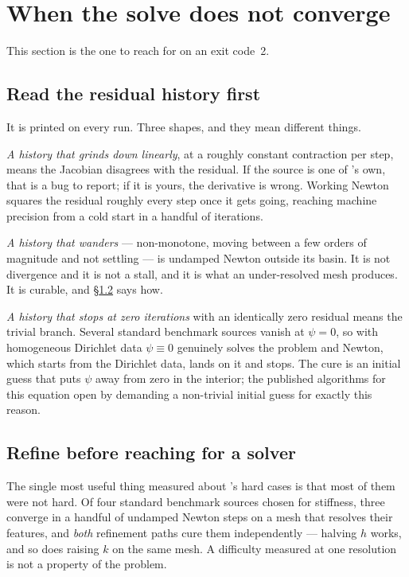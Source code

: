 \section{When the solve does not converge}
\label{sec:notconverge}

This section is the one to reach for on an exit code~2.

\subsection{Read the residual history first}

It is printed on every run. Three shapes, and they mean different things.

\emph{A history that grinds down linearly}, at a roughly constant contraction
per step, means the Jacobian disagrees with the residual. If the source is one
of {\meq}'s own, that is a bug to report; if it is yours, the derivative is
wrong. Working Newton squares the residual roughly every step once it gets
going, reaching machine precision from a cold start in a handful of iterations.

\emph{A history that wanders} --- non-monotone, moving between a few orders of
magnitude and not settling --- is undamped Newton outside its basin. It is not
divergence and it is not a stall, and it is what an under-resolved mesh
produces. It is curable, and \S\ref{sec:ladder} says how.

\emph{A history that stops at zero iterations} with an identically zero residual
means the trivial branch. Several standard benchmark sources vanish at
$\psi = 0$, so with homogeneous Dirichlet data $\psi \equiv 0$ genuinely solves
the problem and Newton, which starts from the Dirichlet data, lands on it and
stops. The cure is an initial guess that puts $\psi$ away from zero in the
interior; the published algorithms for this equation open by demanding a
non-trivial initial guess for exactly this reason.

\subsection{Refine before reaching for a solver}
\label{sec:ladder}

The single most useful thing measured about {\meq}'s hard cases is that most of
them were not hard. Of four standard benchmark sources chosen for stiffness,
three converge in a handful of undamped Newton steps on a mesh that resolves
their features, and \emph{both} refinement paths cure them independently ---
halving $h$ works, and so does raising $k$ on the same mesh. A difficulty
measured at one resolution is not a property of the problem.

